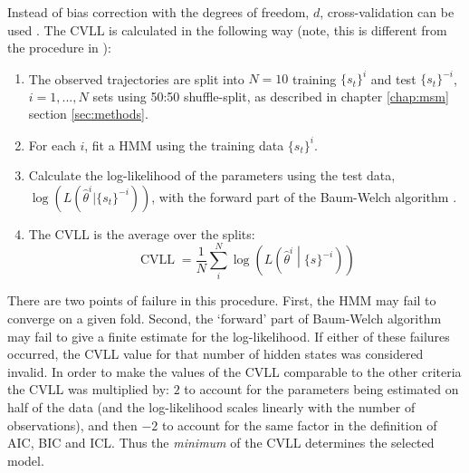 Instead of bias correction with the degrees of freedom, $d$, cross-validation can be used  \cite{celeuxSelectingHiddenMarkov2008}. The CVLL is calculated in the following way (note, this is different from the procedure in \cite{celeuxSelectingHiddenMarkov2008}): 
\begin{enumerate}
    \item The observed trajectories are split into $N = 10$ training $\{s_t\}^{i}$ and test $\{s_t\}^{-i}$, $i = 1, ..., N$ sets using 50:50 shuffle-split, as described in chapter \ref{chap:msm} section \ref{sec:methods}. 
    \item For each $i$, fit a HMM using the training data $\{s_t\}^{i}$. \label{} 
    \item Calculate the log-likelihood of the parameters using the test data,  $\log{\left(L(\hat{\theta}^{i}|\{s_t\}^{-i})\right)}$, with the forward part of the Baum-Welch algorithm \cite{rabinerTutorialHiddenMarkov1989}. 
    \item The CVLL is the average over the splits: 
    \begin{equation}
        \operatorname{CVLL} = \frac{1}{N}\sum_{i}^{N}\log{\left(L\left(\hat{\theta}^{i} \middle | \{s\}^{-i}\right)\right)}
    \end{equation}
\end{enumerate}
There are two points of failure in this procedure. First, the HMM may fail to converge on a given fold. Second, the `forward' part of Baum-Welch algorithm may fail to give a finite estimate for the log-likelihood. If either of these failures occurred, the CVLL value for that number of hidden states was considered invalid.  In order to make the values of the CVLL comparable to the other criteria the CVLL was multiplied by: $2$ to account for the parameters being estimated on half of the data (and the log-likelihood scales linearly with the number of observations), and then $-2$ to account for the same factor in the definition of AIC, BIC and ICL. Thus the \emph{minimum} of the CVLL determines the selected model.

